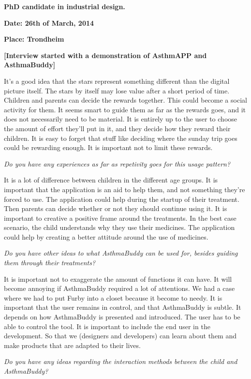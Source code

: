 \textbf{PhD candidate in industrial design.} 

\textbf{Date: 26th of March, 2014}

\textbf{Place: Trondheim}

\textbf{[Interview started with a demonstration of AsthmAPP and AsthmaBuddy]}

It's a good idea that the stars represent something different than the digital picture itself. The stars by itself may lose value after a short period of time. Children and parents can decide the rewards together. This could become a social activity for them. 
It seems smart to guide them as far as the rewards goes, and it does not necessarily need to be material. It is entirely up to the user to choose the amount of effort they'll put in it, and they decide how they reward their children. It is easy to forget that stuff like deciding where the sunday trip goes could be rewarding enough. It is important not to limit these rewards. 

\emph{Do you have any experiences as far as repetivity goes for this usage pattern?}

It is a lot of difference between children in the different age groups. It is important that the application is an aid to help them, and not something they're forced to use. The application could help during the startup of their treatment. Then parents can decide whether or not they should continue using it. It is important to creative a positive frame around the treatments. In the best case scenario, the child understands why they use their medicines. The application could help by creating a better attitude around the use of medicines. 

\emph{Do you have other ideas to what AsthmaBuddy can be used for, besides guiding them through their treatments?}

It is important not to exaggerate the amount of functions it can have. It will become annoying if AsthmaBuddy required a lot of attentions. We had a case where we had to put Furby into a closet because it become to needy. It is important that the user remains in control, and that AsthmaBuddy is subtle. It depends on how AsthmaBuddy is presented and introduced. The user has to be able to control the tool. It is important to include the end user in the development. So that we (designers and developers) can learn about them and make products that are adapted to their lives.   

\emph{Do you have any ideas regarding the interaction methods between the child and AsthmaBuddy?}

